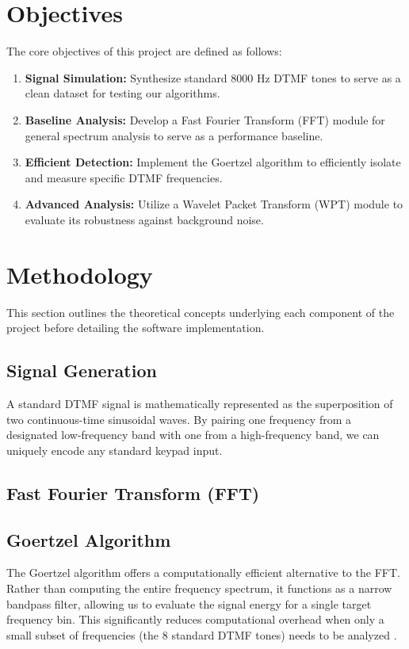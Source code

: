 \documentclass[12pt, a4paper]{article}
\begin{document}
\section{Objectives}
The core objectives of this project are defined as follows:
\begin{enumerate}
    \item \textbf{Signal Simulation:} Synthesize standard 8000 Hz DTMF tones to serve as a clean dataset for testing our algorithms.
    \item \textbf{Baseline Analysis:} Develop a Fast Fourier Transform (FFT) module for general spectrum analysis to serve as a performance baseline.
    \item \textbf{Efficient Detection:} Implement the Goertzel algorithm to efficiently isolate and measure specific DTMF frequencies.
    \item \textbf{Advanced Analysis:} Utilize a Wavelet Packet Transform (WPT) module to evaluate its robustness against background noise.
\end{enumerate}

\section{Methodology}
This section outlines the theoretical concepts underlying each component of the project before detailing the software implementation.

\subsection{Signal Generation}
A standard DTMF signal is mathematically represented as the superposition of two continuous-time sinusoidal waves. By pairing one frequency from a designated low-frequency band with one from a high-frequency band, we can uniquely encode any standard keypad input.

\subsection{Fast Fourier Transform (FFT)}

\subsection{Goertzel Algorithm}
The Goertzel algorithm offers a computationally efficient alternative to the FFT. Rather than computing the entire frequency spectrum, it functions as a narrow bandpass filter, allowing us to evaluate the signal energy for a single target frequency bin. This significantly reduces computational overhead when only a small subset of frequencies (the 8 standard DTMF tones) needs to be analyzed \cite{wirelesspi}.
\end{document}
